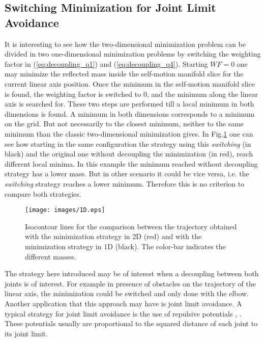 \subsection{Switching Minimization for Joint Limit Avoidance}
\label{subsec:wf_JLA}
It is interesting to see how the two-dimensional minimization problem can be divided in two one-dimensional minimization problems by switching the weighting factor in (\ref{eq:decoupling_q1}) and (\ref{eq:decoupling_q4}). Starting  $WF  = 0$  one may minimize the reflected mass inside the self-motion manifold slice for the current linear axis position. Once the minimum in the self-motion manifold slice is found, the weighting factor is switched to $0$, and the minimum along the linear axis is searched for. These two steps are performed till a local minimum in both dimensions is found. 
A minimum in both dimensions corresponds to a minimum on the grid. But not necessarily to the closest minimum, neither to the same minimum than the classic two-dimensional minimization gives. In  Fig.\ref{fig:1D} one can see how starting in the same configuration the strategy using this \textit{switching} (in black) and the original one without decoupling the minimization (in red), reach different local minima. In this example the minimum reached without decoupling strategy has a lower mass. But in other scenario it could be vice versa, i.e. the \textit{switching}  strategy reaches a lower minimum. 	Therefore this is no criterion to compare both strategies.

\begin{figure}[!htb]
	\centerline{
		\texttt{[image: images/1D.eps]}}
	\caption{Isocontour lines for the comparison between the trajectory obtained with the minimization strategy in 2D (red) and with the minimization strategy in 1D (black). The color-bar indicates the different masses.}
	\label{fig:1D}
\end{figure} 


The strategy here introduced may be of interest when a decoupling between both joints is of interest. For example in presence of obstacles on the trajectory of the linear axis, the minimization could be switched and only done with the elbow.
Another application that this approach may have is joint limit avoidance.
A typical strategy for joint limit avoidance is the use of repulsive potentials \cite{JLA_3}, \cite{JLA_4}. These potentials usually are proportional to the squared distance of each joint to its joint limit. 

